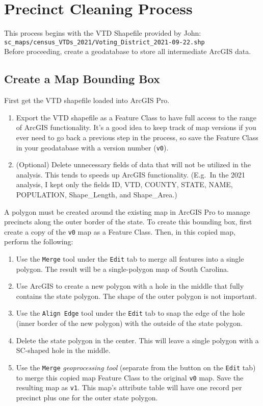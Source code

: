 \documentclass[11pt]{article}
\begin{document}
\section{Precinct Cleaning Process}

This process begins with the VTD Shapefile provided by John:\\
\verb|sc_maps/census_VTDs_2021/Voting_District_2021-09-22.shp|\\

Before proceeding, create a geodatabase to store all intermediate ArcGIS data.

\subsection{Create a Map Bounding Box}

First get the VTD shapefile loaded into ArcGIS Pro.

\begin{enumerate}
\item Export the VTD shapefile as a Feature Class to have full access to the range of ArcGIS functionality. It's a good idea to keep track of map versions if you ever need to go back a previous step in the process, so save the Feature Class in your geodatabase with a version number (\verb|v0|).
\item (Optional) Delete unnecessary fields of data that will not be utilized in the analysis. This tends to speeds up ArcGIS functionality. (E.g.\ In the 2021 analysis, I kept only the fields ID, VTD, COUNTY, STATE, NAME, POPULATION, Shape\_Length, and Shape\_Area.)
\end{enumerate}

A polygon must be created around the existing map in ArcGIS Pro to manage precincts along the outer border of the state. To create this bounding box, first create a copy of the \verb|v0| map as a Feature Class. Then, in this copied map, perform the following:
\begin{enumerate}
\item Use the \verb|Merge| tool under the \verb|Edit| tab to merge all features into a single polygon. The result will be a single-polygon map of South Carolina.
\item Use ArcGIS to create a new polygon with a hole in the middle that fully contains the state polygon. The shape of the outer polygon is not important.
\item Use the \verb|Align Edge| tool under the \verb|Edit| tab to snap the edge of the hole (inner border of the new polygon) with the outside of the state polygon.
\item Delete the state polygon in the center. This will leave a single polygon with a SC-shaped hole in the middle.
\item Use the \verb|Merge| \textit{geoprocessing tool} (separate from the button on the \verb|Edit| tab) to merge this copied map Feature Class to the original \verb|v0| map. Save the resulting map as \verb|v1|. This map's attribute table will have one record per precinct plus one for the outer state polygon.
\end{enumerate}
\end{document}

